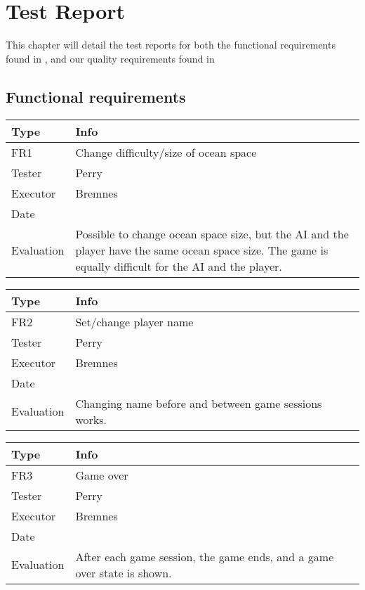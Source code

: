 \chapter{Test Report}


This chapter will detail the test reports for both the functional requirements found in %
, and our quality requirements found in %


\section{Functional requirements}

\begin{tabular}{|p{2cm}|p{9.5cm}|}
	\hline
	\bf{Type}	& \bf{Info} \\
	\hline
	FR1			& Change difficulty/size of ocean space \\
	Tester		& Perry \\
	Executor	& Bremnes \\
	Date		& \date{\today} \\
	Evaluation	& Possible to change ocean space size, but the AI and the player have the same ocean space size. The game is equally difficult for the AI and the player. \\
	\hline
\end{tabular}

\vspace{0.5em}

\noindent
\begin{tabular}{|p{2cm}|p{9.5cm}|}
	\hline
	\bf{Type}	& \bf{Info} \\
	\hline
	FR2			& Set/change player name \\
	Tester		& Perry \\
	Executor	& Bremnes \\
	Date		& \date{\today} \\
	Evaluation	& Changing name before and between game sessions works. \\
	\hline
\end{tabular}

\vspace{0.5em}

\noindent
\begin{tabular}{|p{2cm}|p{9.5cm}|}
	\hline
	\bf{Type}	& \bf{Info} \\
	\hline
	FR3			& Game over \\
	Tester		& Perry \\
	Executor	& Bremnes \\
	Date		& \date{\today} \\
	Evaluation	& After each game session, the game ends, and a game over state is shown. \\
	\hline
\end{tabular}

